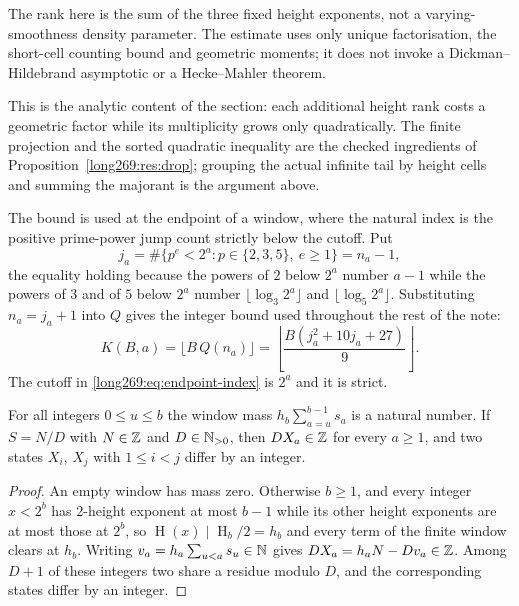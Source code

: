 \documentclass[11pt]{article}
\newcommand{\hgt}{\operatorname{H}}
\begin{document}
The rank here is the sum of the three fixed height exponents, not a
varying-smoothness density parameter. The estimate uses only unique
factorisation, the short-cell counting bound and geometric moments; it does
not invoke a Dickman--Hildebrand asymptotic or a Hecke--Mahler theorem.

This is the analytic content of the section: each additional height rank costs
a geometric factor while its multiplicity grows only quadratically.  The finite
projection and the sorted quadratic inequality are the checked ingredients of
Proposition~\ref{long269:res:drop}; grouping the actual infinite tail by height cells
and summing the majorant is the argument above.

The bound is used at the endpoint of a window, where the natural index is the
positive prime-power jump count strictly below the cutoff.  Put
\begin{equation}\label{long269:eq:endpoint-index}
 j_a=\#\{p^{e}<2^{a}:p\in\{2,3,5\},\ e\ge1\}=n_a-1 ,
\end{equation}
the equality holding because the powers of $2$ below $2^{a}$ number $a-1$ while
the powers of $3$ and of $5$ below $2^{a}$ number $\lfloor\log_3 2^{a}\rfloor$
and $\lfloor\log_5 2^{a}\rfloor$.  Substituting $n_a=j_a+1$ into $Q$ gives the
integer bound used throughout the rest of the note:
\begin{equation}\label{long269:eq:actual-bound}
 K(B,a)=\bigl\lfloor B\,Q(n_a)\bigr\rfloor
 =\left\lfloor\frac{B(j_a^{2}+10j_a+27)}9\right\rfloor .
\end{equation}
The cutoff in \eqref{long269:eq:endpoint-index} is $2^{a}$ and it is strict.

\begin{lemma}\label{long269:res:all-scale-lattice}
For all integers $0\le u\le b$ the window mass $h_b\sum_{a=u}^{b-1}s_a$ is a
natural number.  If $S=N/D$ with $N\in\mathbb{Z}$ and $D\in\mathbb{N}_{>0}$, then $DX_a\in\mathbb{Z}$
for every $a\ge1$, and two states $X_i$, $X_j$ with $1\le i<j$ differ by an
integer.
\end{lemma}

\begin{proof}
An empty window has mass zero.  Otherwise $b\ge1$, and every integer $x<2^{b}$
has $2$-height exponent at most $b-1$ while its other height exponents are at
most those at $2^{b}$, so $\hgt(x)\mid\hgt_b/2=h_b$ and every term of the
finite window clears at $h_b$.  Writing $v_a=h_a\sum_{u<a}s_u\in\mathbb{N}$ gives
$DX_a=h_aN-Dv_a\in\mathbb{Z}$.  Among $D+1$ of these integers two share a residue
modulo $D$, and the corresponding states differ by an integer.
\end{proof}
\end{document}
